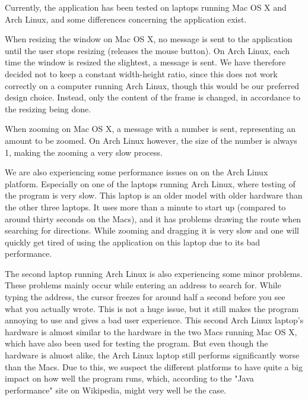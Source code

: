 
                Currently, the application has been tested on laptops running Mac OS X and Arch Linux, and some differences concerning the application exist.

                When resizing the window on Mac OS X, no message is sent to the application until the user stops resizing (releases the mouse button). On Arch Linux, each time the window is resized the slightest, a message is sent. We have therefore decided not to keep a constant width-height ratio, since this does not work correctly on a computer running Arch Linux, though this would be our preferred design choice. Instead, only the content of the frame is changed, in accordance to the resizing being done.

                When zooming on Mac OS X, a message with a number is sent, representing an amount to be zoomed. On Arch Linux however, the size of the number is always 1, making the zooming a very slow process.

                We are also experiencing some performance issues on on the Arch Linux platform. Especially on one of the laptops running Arch Linux, where testing of the program is very slow. This laptop is an older model with older hardware than the other three laptops. It uses more than a minute to start up (compared to around thirty seconds on the Macs), and it has problems drawing the route when searching for directions. While zooming and dragging it is very slow and one will quickly get tired of using the application on this laptop due to its bad performance.
                
                The second laptop running Arch Linux is also experiencing some minor problems. These problems mainly occur while entering an address to search for. While typing the address, the cursor freezes for around half a second before you see what you actually wrote. This is not a huge issue, but it still makes the program annoying to use and gives a bad user experience. This second Arch Linux laptop's hardware is almost similar to the hardware in the two Macs running Mac OS X, which have also been used for testing the program. But even though the hardware is almost alike, the Arch Linux laptop still performs significantly worse than the Macs. Due to this, we suspect the different platforms to have quite a big impact on how well the program runs, which, according to the "Java performance" site on Wikipedia, might very well be the case. 
